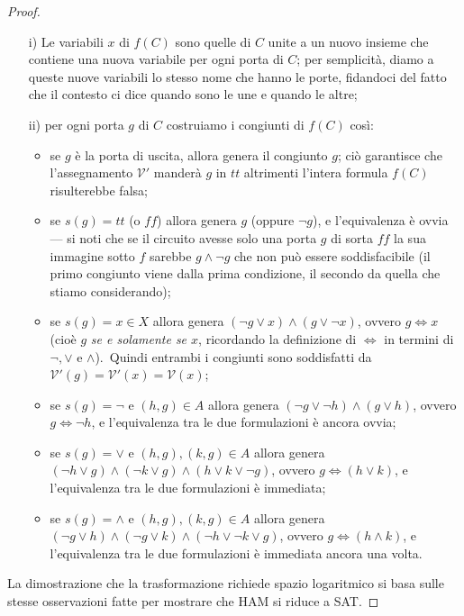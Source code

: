 \begin{proof}
    \begin{itemize}
        \item[i)] Le variabili $x$ di $f(C)$ sono quelle di $C$ unite a un nuovo insieme che contiene una nuova variabile per ogni porta di $C$; per semplicità, diamo a queste nuove variabili lo stesso nome che hanno le porte, fidandoci del fatto che il contesto ci dice quando sono le une e quando le altre;
        \item[ii)] per ogni porta $g$ di $C$ costruiamo i congiunti di $f(C)$ così:
              \begin{itemize}
                  \item se $g$ è la porta di uscita, allora genera il congiunto $g$; ciò garantisce che l'assegnamento $\mathcal{V}'$ manderà $g$ in $\mathit{tt}$ altrimenti l'intera formula $f(C)$ risulterebbe falsa;
                  \item se $s(g) = \mathit{tt}$ (o $\mathit{ff}$) allora genera $g$ (oppure $\neg g$), e l'equivalenza è ovvia --- si noti che se il circuito avesse solo una porta $g$ di sorta $\mathit{ff}$ la sua immagine sotto $f$ sarebbe $g \land \neg g$ che non può essere soddisfacibile (il primo congiunto viene dalla prima condizione, il secondo da quella che stiamo considerando);
                  \item se $s(g) = x \in X$ allora genera $(\neg g \lor x) \land (g \lor \neg x)$, ovvero $g \Longleftrightarrow x$ (cioè $g$ \textit{se e solamente se $x$}, ricordando la definizione di $\Longleftrightarrow$ in termini di $\neg, \lor$ e $\land$).\
                        Quindi entrambi i congiunti sono soddisfatti da $\mathcal{V}'(g) = \mathcal{V}'(x) = \mathcal{V}(x)$;
                  \item se $s(g) = \neg$ e $(h, g) \in A$ allora genera $(\neg g \lor \neg h) \land (g \lor h)$, ovvero $g \Longleftrightarrow \neg h$, e l'equivalenza tra le due formulazioni è ancora ovvia;
                  \item se $s(g) = \lor$ e $(h, g),(k, g) \in A$ allora genera $(\neg h \lor g) \land (\neg k \lor g) \land (h \lor k \lor \neg g)$, ovvero $g \Longleftrightarrow (h \lor k)$, e l'equivalenza tra le due formulazioni è immediata;
                  \item se $s(g) = \land$ e $(h, g),(k, g) \in A$ allora genera $(\neg g \lor h) \land (\neg g \lor k) \land (\neg h \lor \neg k \lor g)$, ovvero $g \Longleftrightarrow (h \land k)$, e l'equivalenza tra le due formulazioni è immediata ancora una volta.
              \end{itemize}
    \end{itemize}
    La dimostrazione che la trasformazione richiede spazio logaritmico si basa sulle stesse osservazioni fatte per mostrare che {\footnotesize HAM} si riduce a {\footnotesize SAT}.

\end{proof}

